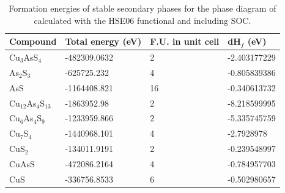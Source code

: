 \documentclass[11pt, twoside]{report}
\begin{document}
\begin{table}[]\label{enargite_elements}
\begin{tabular}{@{}llll@{}}
\toprule
Compound      & Total energy (eV) & F.U. in unit cell & dH$_f$ (eV)     \\ \midrule
Cu$_3$AsS$_4$ & -482309.0632      & 2                 & -2.403177229 \\
As$_2$S$_3$         & -625725.232       & 4                 & -0.805839386 \\
AsS           & -1164408.821      & 16                & -0.340613732 \\ 
Cu$_{12}$As$_4$S$_{13}$    & -1863952.98       & 2                 & -8.218599995 \\
Cu$_6$As$_4$S$_9$      & -1233959.866      & 2                 & -5.335745759 \\
Cu$_7$S$_4$         & -1440968.101      & 4                 & -2.7928978   \\
CuS$_2$          & -134011.9191      & 2                 & -0.239548997 \\
CuAsS         & -472086.2164      & 4                 & -0.784957703 \\
CuS           & -336756.8533      & 6                 & -0.502980657 \\ \bottomrule
\end{tabular}
\caption{Formation energies of stable secondary phases for the phase diagram of {\enargite} calculated with the HSE06 functional and including SOC.}\label{enargite_stable}
\end{table}
\end{document}
